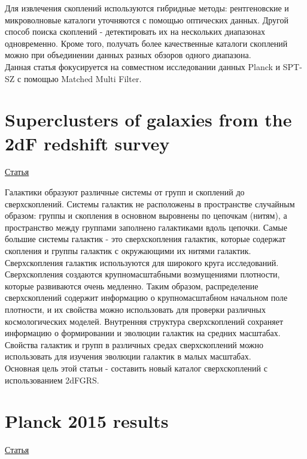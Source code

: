 \documentclass{article}
\begin{document}
Для извлечения скоплений используются гибридные методы: рентгеновские и микроволновые каталоги 
уточняются с помощью оптических данных. Другой способ поиска скоплений - детектировать их на 
нескольких диапазонах одновременно. Кроме того, получать более качественные каталоги скоплений 
можно при объединении данных разных обзоров одного диапазона.\\

Данная статья фокусируется на совместном исследовании данных Planck и SPT-SZ с помощью Matched 
Multi Filter.\\

\section{Superclusters of galaxies from the 2dF redshift survey}
\hyperlink{https://www.aanda.org/articles/aa/pdf/2007/05/aa5296-06.pdf}{Статья}

Галактики образуют различные системы от групп и скоплений до сверхскоплений. Системы галактик 
не расположены в пространстве случайным образом: группы и скопления в основном выровнены по 
цепочкам (нитям), а пространство между группами заполнено галактиками вдоль цепочки. Самые большие
системы галактик - это сверхскопления галактик, которые содержат скопления и группы галактик с 
окружающими их нитями галактик.\\

Сверхскопления галактик используются для широкого круга исследований. Сверхскопления создаются
крупномасштабными возмущениями плотности, которые развиваются очень медленно. Таким образом, 
распределение сверхскоплений содержит информацию о крупномасштабном начальном поле плотности, и их 
свойства можно использовать для проверки различных космологических моделей. Внутренняя структура
сверхскоплений сохраняет информацию о формировании и эволюции галактик на средних масштабах. 
Свойства галактик и групп в различных средах сверхскоплений можно использовать для изучения 
эволюции галактик в малых масштабах.\\

Основная цель этой статьи - составить новый каталог сверхскоплений с использованием 2dFGRS.\\

\section{Planck 2015 results}
\hyperlink{https://www.aanda.org/articles/aa/pdf/2016/10/aa25823-15.pdf}{Статья}
\end{document}
